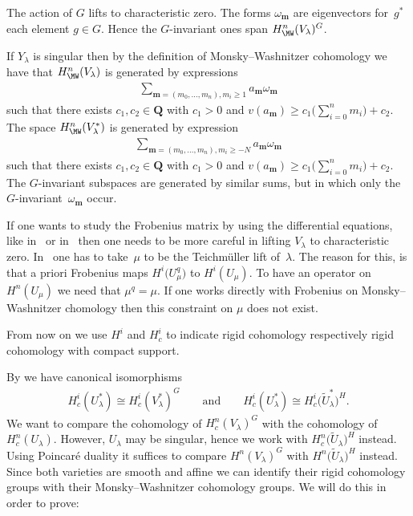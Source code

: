 \begin{Remark} The action of $G$ lifts to characteristic zero. The forms $\omega_{\mathbf{m}}$ are eigenvectors for~$g^*$ each element $g\in G$. Hence the $G$-invariant ones span $H^n_{\MW}(V_\lambda)^G$.

If $Y_{\lambda}$ is singular then by the def\/inition of Monsky--Washnitzer cohomology we have that $H^n_{\MW}(V_\lambda)$ is generated by expressions
\begin{gather*} \sum_{\mathbf{m}=(m_0,\dots,m_n),m_i\geq 1} a_{\mathbf{m}} \omega_{\mathbf{m}}\end{gather*}
such that there exists $c_1,c_2 \in \mathbf{Q}$ with $c_1>0$ and $v(a_{\mathbf{m}})\geq c_1\big(\sum\limits_{i=0}^n m_i\big)+c_2$. The space $H^n_{\MW}(V_\lambda^*)$ is generated by expression
\begin{gather*} \sum_{\mathbf{m}=(m_0,\dots,m_n),m_i\geq -N} a_{\mathbf{m}} \omega_{\mathbf{m}}\end{gather*}
such that there exists $c_1,c_2 \in \mathbf{Q}$ with $c_1>0$ and $v(a_{\mathbf{m}})\geq c_1\big(\sum\limits_{i=0}^n m_i\big)+c_2$. The $G$-invariant subspaces are generated by similar sums, but in which only the $G$-invariant~$\omega_{\mathbf{m}}$ occur.
\end{Remark}

\begin{Remark} If one wants to study the Frobenius matrix by using the dif\/ferential equations, like in~\cite{Katz} or in~\cite{DKSSVW} then one needs to be more careful in lifting $V_\lambda$ to characteristic zero. In~\cite{Katz} one has to take~$\mu$ to be the Teichm\"uller lift of~$\lambda$. The reason for this, is that a priori Frobenius maps $H^i\big(U_\mu^q\big)$ to $H^i(U_\mu)$. To have an operator on $H^n(U_\mu)$ we need that $\mu^q=\mu$. If one works directly with Frobenius on Monsky--Washnitzer chomology then this constraint on $\mu$ does not exist.
\end{Remark}

From now on we use $H^i$ and $H^i_c$ to indicate rigid cohomology respectively rigid cohomology with compact support.

By \cite[Proposition 2.1]{Zetafamrec} we have canonical isomorphisms
\begin{gather*} H^i_c(U_\lambda^*)\cong H^i_c(V_\lambda^*)^G \qquad \text{and} \qquad H^i_c(U_\lambda^*)\cong H^i_c\big(\tilde{U}_\lambda^*\big)^H.\end{gather*}
We want to compare the cohomology of $H^n_c(V_\lambda)^G$ with the cohomology of~$H^n_c(U_{\lambda})$. However, $U_\lambda$ may be singular, hence we work with $H^n_c\big(\tilde{U}_\lambda\big)^ H$ instead. Using Poin\-car\'e duality it suf\/f\/ices to compare $H^n(V_\lambda)^ G$ with $H^n\big(\tilde{U}_\lambda\big)^H$ instead. Since both varieties are smooth and af\/f\/ine we can identify their rigid cohomology groups with their Monsky--Washnitzer cohomology groups. We will do this in order to prove:

